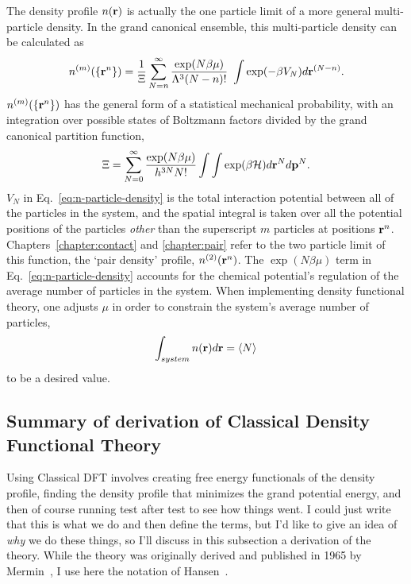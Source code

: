 The density profile $n(\textbf{r})$ is actually the one particle limit of a
more general multi-particle density.  In the grand canonical ensemble,
this multi-particle density can be calculated as
\begin{align}
  \label{eq:n-particle-density}
  n^{(m)}(\{\textbf{r}^n\})=\frac{1}{\Xi}\sum^{\infty}_{N=n}\frac{\exp(N\beta \mu)}{\Lambda^3 (N-n)!} \
  \int \exp(-\beta V_N)d\textbf{r}^{(N-n)}.
\end{align}
$n^{(m)}(\{\textbf{r}^n\})$ has the general form of a statistical mechanical
probability, with an integration over possible states of Boltzmann
factors divided by the grand canonical partition function,
\begin{align}
  \Xi = \sum_{N=0}^{\infty}\frac{\exp(N\beta\mu)}{h^{3N}N!}\int\int \exp(\beta \mathcal{H})d\textbf{r}^Nd\mathbf{p}^N.
\end{align}
$V_N$ in Eq.~\ref{eq:n-particle-density} is the total interaction
potential between all of the particles in the system, and the spatial
integral is taken over all the potential positions of the particles
\emph{other} than the superscript $m$ particles at positions $\textbf{r}^n$.
Chapters~\ref{chapter:contact} and \ref{chapter:pair} refer to the two
particle limit of this function, the `pair density' profile,
$n^{(2)}(\textbf{r}^n)$.  The $\exp(N\beta \mu)$ term in
Eq.~\ref{eq:n-particle-density} accounts for the chemical potential's
regulation of the average number of particles in the system.  When
implementing density functional theory, one adjusts $\mu$ in order to
constrain the system's average number of particles,
\begin{align}
  \int_{system} n(\textbf{r})d\textbf{r} = \langle N \rangle
\end{align}
to be a desired value.

\subsection{Summary of derivation of Classical Density Functional Theory}
Using Classical DFT involves creating free energy functionals of the
density profile, finding the density profile that minimizes the grand
potential energy, and then of course running test after test to see
how things went.  I could just write that this is what we do and then
define the terms, but I'd like to give an idea of \emph{why} we do
these things, so I'll discuss in this subsection a derivation of the
theory.  While the theory was originally derived and published in 1965
by Mermin~\cite{mermin1965thermal}, I use here the notation of
Hansen~\cite{hansen2006theory}.

